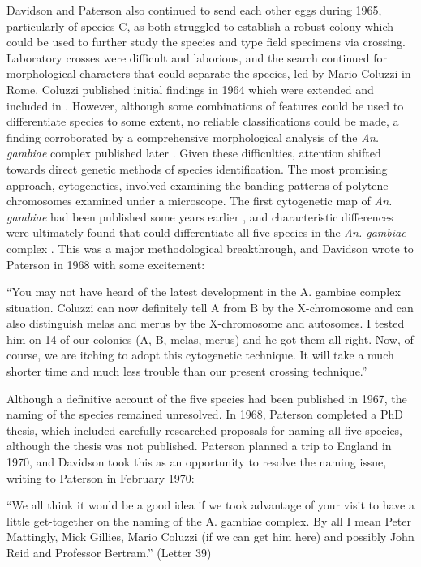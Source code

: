 \documentclass[a4paper,11pt,abstracton,hidelinks]{scrartcl}
\begin{document}
Davidson and Paterson also continued to send each other eggs during 1965, particularly of species C, as both struggled to establish a robust colony which could be used to further study the species and type field specimens via crossing. 
Laboratory crosses were difficult and laborious, and the search continued for morphological characters that could separate the species, led by Mario Coluzzi in Rome. 
Coluzzi published initial findings in 1964 \citep{Coluzzi1964} which were extended and included in \citet{Davidson1967}. 
However, although some combinations of features could be used to differentiate species to some extent, no reliable classifications could be made, a finding corroborated by a comprehensive morphological analysis of the \textit{An. gambiae} complex published later \citep{Coetzee1989}. 
Given these difficulties, attention shifted towards direct genetic methods of species identification. 
The most promising approach, cytogenetics, involved examining the banding patterns of polytene chromosomes examined under a microscope. 
The first cytogenetic map of \textit{An. gambiae} had been published some years earlier \citep{Frizzi1956}, and characteristic differences were ultimately found that could differentiate all five species in the \textit{An. gambiae} complex \citep{Coluzzi1967,Coluzzi1968,Coluzzi1969}.
This was a major methodological breakthrough, and Davidson wrote to Paterson in 1968 with some excitement:

\begin{displayquote}
``You may not have heard of the latest development in the A. gambiae complex situation. Coluzzi can now definitely tell A from B by the X-chromosome and can also distinguish melas and merus by the X-chromosome and autosomes. I tested him on 14 of our colonies (A, B, melas, merus) and he got them all right. Now, of course, we are itching to adopt this cytogenetic technique. It will take a much shorter time and much less trouble than our present crossing technique.''
\end{displayquote}


Although a definitive account of the five species had been published in 1967, the naming of the species remained unresolved. In 1968, Paterson completed a PhD thesis, which included carefully researched proposals for naming all five species, although the thesis was not published. Paterson planned a trip to England in 1970, and Davidson took this as an opportunity to resolve the naming issue, writing to Paterson in February 1970:


\begin{displayquote}
``We all think it would be a good idea if we took advantage of your visit to have a little get-together on the naming of the A. gambiae complex. By all I mean Peter Mattingly, Mick Gillies, Mario Coluzzi (if we can get him here) and possibly John Reid and Professor Bertram.'' (Letter 39)
\end{displayquote}
\end{document}

